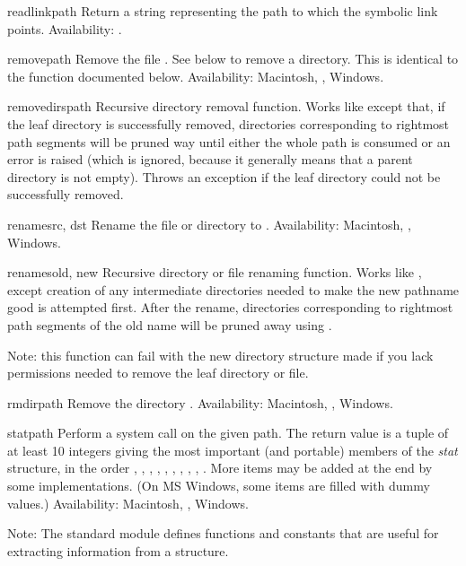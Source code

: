 \begin{funcdesc}{readlink}{path}
Return a string representing the path to which the symbolic link
points.
Availability: \UNIX{}.
\end{funcdesc}

\begin{funcdesc}{remove}{path}
Remove the file .  See  below to remove a
directory.  This is identical to the  function
documented below.
Availability: Macintosh, \UNIX{}, Windows.
\end{funcdesc}

\begin{funcdesc}{removedirs}{path}
Recursive directory removal function.  Works like
 except that, if the leaf directory is
successfully removed, directories corresponding to rightmost path
segments will be pruned way until either the whole path is consumed or
an error is raised (which is ignored, because it generally means that
a parent directory is not empty).  Throws an 
exception if the leaf directory could not be successfully removed.
\end{funcdesc}

\begin{funcdesc}{rename}{src, dst}
Rename the file or directory  to .
Availability: Macintosh, \UNIX{}, Windows.
\end{funcdesc}

\begin{funcdesc}{renames}{old, new}
Recursive directory or file renaming function.
Works like , except creation of any intermediate
directories needed to make the new pathname good is attempted first.
After the rename, directories corresponding to rightmost path segments
of the old name will be pruned away using .

Note: this function can fail with the new directory structure made if
you lack permissions needed to remove the leaf directory or file.
\end{funcdesc}

\begin{funcdesc}{rmdir}{path}
Remove the directory .
Availability: Macintosh, \UNIX{}, Windows.
\end{funcdesc}

\begin{funcdesc}{stat}{path}
Perform a  system call on the given path.  The
return value is a tuple of at least 10 integers giving the most
important (and portable) members of the \emph{stat} structure, in the
order
,
,
,
,
,
,
,
,
,
.
More items may be added at the end by some implementations.
(On MS Windows, some items are filled with dummy values.)
Availability: Macintosh, \UNIX{}, Windows.

Note: The standard module  defines
functions and constants that are useful for extracting information
from a  structure.
\end{funcdesc}

